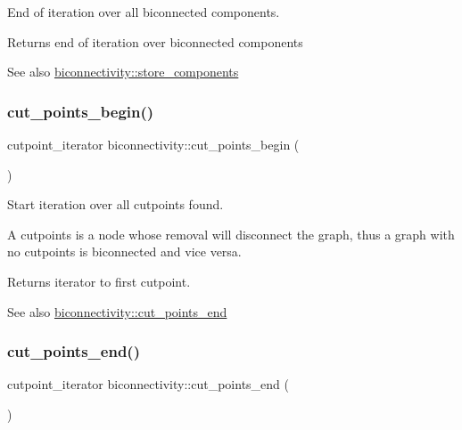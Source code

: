 End of iteration over all biconnected components. 

\begin{DoxyReturn}{Returns}
end of iteration over biconnected components 
\end{DoxyReturn}
\begin{DoxySeeAlso}{See also}
\mbox{\hyperlink{classbiconnectivity_a1234e7a70f50fd60c855529fe6fa4acb}{biconnectivity\+::store\+\_\+components}} 
\end{DoxySeeAlso}
\mbox{\label{classbiconnectivity_a473197552874aaf148e847838144eed7}} 
\subsubsection{\texorpdfstring{cut\+\_\+points\+\_\+begin()}{cut\_points\_begin()}}
{\footnotesize\ttfamily cutpoint\+\_\+iterator biconnectivity\+::cut\+\_\+points\+\_\+begin (\begin{DoxyParamCaption}{ }\end{DoxyParamCaption})\hspace{0.3cm}{\ttfamily [inline]}}



Start iteration over all cutpoints found. 

A cutpoints is a node whose removal will disconnect the graph, thus a graph with no cutpoints is biconnected and vice versa.

\begin{DoxyReturn}{Returns}
iterator to first cutpoint. 
\end{DoxyReturn}
\begin{DoxySeeAlso}{See also}
\mbox{\hyperlink{classbiconnectivity_a78cb06c1d056b9519622a67a92e85b6e}{biconnectivity\+::cut\+\_\+points\+\_\+end}} 
\end{DoxySeeAlso}
\mbox{\label{classbiconnectivity_a78cb06c1d056b9519622a67a92e85b6e}} 
\subsubsection{\texorpdfstring{cut\+\_\+points\+\_\+end()}{cut\_points\_end()}}
{\footnotesize\ttfamily cutpoint\+\_\+iterator biconnectivity\+::cut\+\_\+points\+\_\+end (\begin{DoxyParamCaption}{ }\end{DoxyParamCaption})\hspace{0.3cm}{\ttfamily [inline]}}



